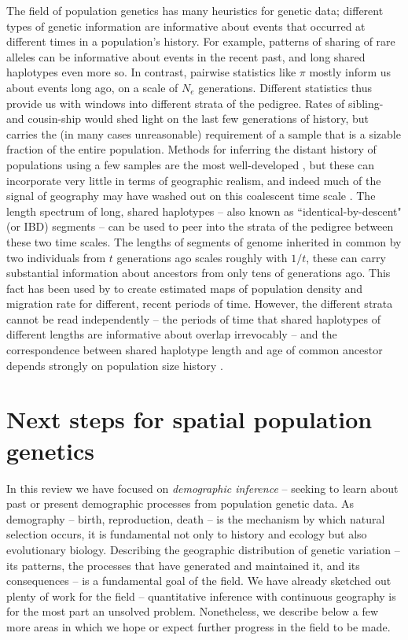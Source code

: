 \documentclass{ar-1col}
\newcommand{\g}[1]{{\color{blue}{#1}}}
\renewcommand{\emph}[1]{{\textit{#1}}}
\begin{document}
The field of population genetics has many heuristics for genetic data; 
different types of genetic information are informative 
about events that occurred at different times in a population's history.
For example, patterns of sharing of rare alleles can be informative about events in the recent past,
and long shared haplotypes even more so.
In contrast, pairwise statistics like $\pi$ \g{or $F_{ST}$} mostly inform us about events long ago,
on a scale of $N_e$ generations.
Different statistics thus provide us with windows into different strata of the pedigree.
Rates of sibling- and cousin-ship 
would shed light on the last few generations of history,
but carries the (in many cases unreasonable) requirement of a sample 
that is a sizable fraction of the entire population.
Methods for inferring the distant history of populations using a few samples
are the most well-developed \citep[e.g.,][]{dadi,Li_Durbin2011,momi},
but these can incorporate very little in terms of geographic realism,
and indeed much of the signal of geography 
may have washed out on this coalescent time scale \citep{wilkins2004separationoftimescales}.
The length spectrum of long, shared haplotypes --
also known as ``identical-by-descent" (or IBD) segments --
can be used to peer into the strata of the pedigree between these two time scales.
The lengths of segments of genome inherited in common by two individuals
from $t$ generations ago scales roughly with $1/t$, 
these can carry substantial information about ancestors from only tens of generations ago.
This fact has been used by \citet{alasadi2018estimating}
to create estimated maps of population density and migration rate
for different, recent periods of time.
However, the different strata cannot be read independently
-- the periods of time that shared haplotypes of different lengths are informative about 
overlap irrevocably
-- and the correspondence between shared haplotype length and age of common ancestor
depends strongly on population size history \citep{ralph2013geography}.


\section{Next steps for spatial population genetics}

In this review we have focused on \emph{demographic inference} --
seeking to learn about past or present demographic processes
from population genetic data.
As demography -- birth, reproduction, death -- 
is the mechanism by which natural selection occurs,
it is fundamental not only to history and ecology but also evolutionary biology.
Describing the geographic distribution of genetic variation -- 
its patterns, 
the processes that have generated and maintained it, 
and its consequences -- 
is a fundamental goal of the field.
We have already sketched out plenty of work for the field
-- quantitative inference with continuous geography is for the most part an unsolved problem.
Nonetheless, we describe below a few more areas 
in which we hope or expect further progress in the field to be made.
\end{document}
